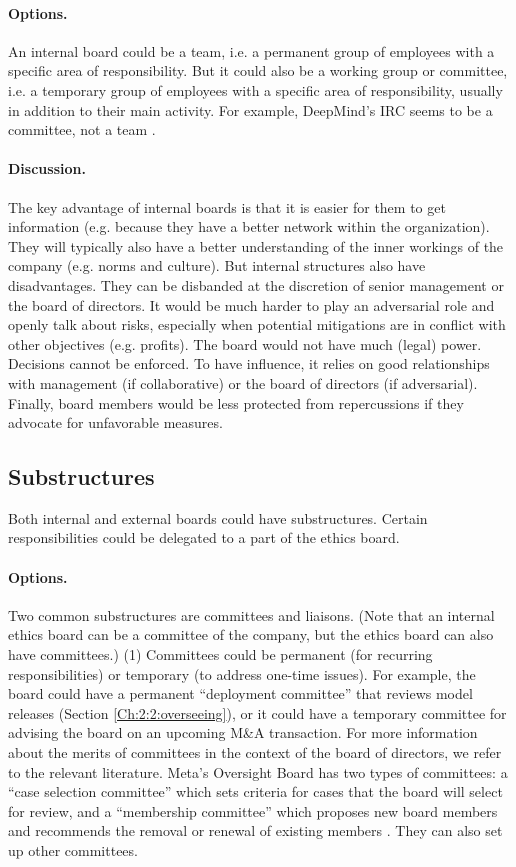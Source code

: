 \documentclass{article}
\begin{document}
\paragraph{Options.} An internal board could be a team, i.e. a permanent group of employees with a specific area of responsibility. But it could also be a working group or committee, i.e. a temporary group of employees with a specific area of responsibility, usually in addition to their main activity. For example, DeepMind’s IRC seems to be a committee, not a team \cite{kavukcuoglu2022alphafold, deepmind2023humanrightspolicy}.

\paragraph{Discussion.} The key advantage of internal boards is that it is easier for them to get information (e.g. because they have a better network within the organization). They will typically also have a better understanding of the inner workings of the company (e.g. norms and culture). But internal structures also have disadvantages. They can be disbanded at the discretion of senior management or the board of directors. It would be much harder to play an adversarial role and openly talk about risks, especially when potential mitigations are in conflict with other objectives (e.g. profits). The board would not have much (legal) power. Decisions cannot be enforced. To have influence, it relies on good relationships with management (if collaborative) or the board of directors (if adversarial). Finally, board members would be less protected from repercussions if they advocate for unfavorable measures.

\subsection{Substructures}\label{Ch:3:3:substructures}

Both internal and external boards could have substructures. Certain responsibilities could be delegated to a part of the ethics board.

\paragraph{Options.} Two common substructures are committees and liaisons. (Note that an internal ethics board can be a committee of the company, but the ethics board can also have committees.) (1) Committees could be permanent (for recurring responsibilities) or temporary (to address one-time issues). For example, the board could have a permanent “deployment committee” that reviews model releases (Section \ref{Ch:2:2:overseeing}), or it could have a temporary committee for advising the board on an upcoming M\&A transaction. For more information about the merits of committees in the context of the board of directors, we refer to the relevant literature. Meta’s Oversight Board has two types of committees: a “case selection committee” which sets criteria for cases that the board will select for review, and a “membership committee” which proposes new board members and recommends the removal or renewal of existing members \cite{oversight2022bylaws}. They can also set up other committees.
\end{document}
